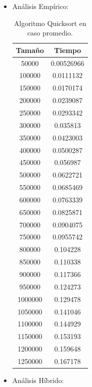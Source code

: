 \documentclass[a4paper,12pt,twoside]{article} %
\begin{document}
	\begin{itemize}
	
		\item Análisis Empírico:
		
\begin{table}[h]
	\begin{center}
		\begin{tabular}{|c|c|}
		\hline
		Tamaño & Tiempo \\
		\hline
		50000 & 0.00526966 \\
		100000 & 0.0111132 \\
		150000 & 0.0170174 \\
		200000 & 0.0239087 \\
		250000 & 0.0293342 \\
		300000 & 0.035813 \\
		350000 & 0.0423003 \\
		400000 & 0.0500287 \\
		450000 & 0.056987 \\
		500000 & 0.0622721 \\
		550000 & 0.0685469 \\
		600000 & 0.0763339 \\
		650000 & 0.0825871 \\
		700000 & 0.0904075 \\
		750000 & 0.0955742 \\
		800000 & 0.104228 \\
		850000 & 0.110338 \\
		900000 & 0.117366 \\
		950000 & 0.124273 \\
		1000000 & 0.129478 \\
		1050000 & 0.141046 \\
		1100000 & 0.144929 \\
		1150000 & 0.153193 \\
		1200000 & 0.159648 \\
		1250000 & 0.167178 \\
		\hline
		\end{tabular}
	\end{center}
	\caption{Algoritmo Quicksort en caso promedio.}
\end{table}
\newpage
		
		\item Análisis Híbrido:
\begin{figure}[h]
  \begin{center}
  

\end{center}
\end{figure}
\end{itemize}
\end{document}
